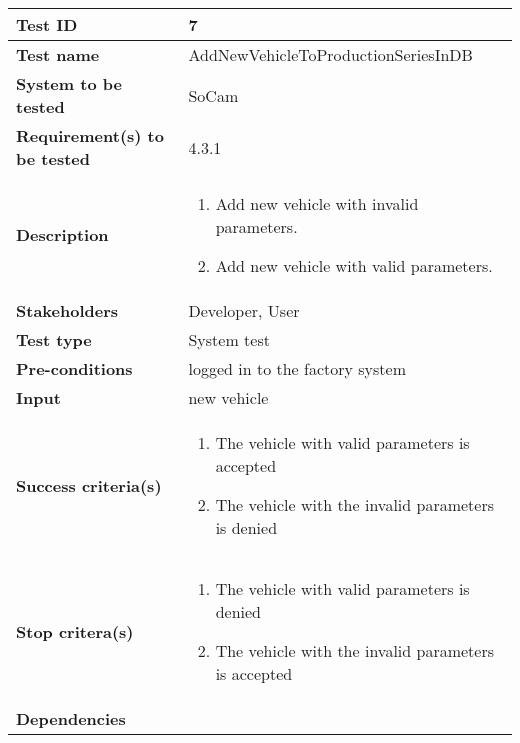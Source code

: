 				\begin{table}[H]
			\begin{tabular}{| p{4cm} | p{10cm} |}
			\hline
			\rowcolor{gray}
				{\bf Test ID} & 7 \\ \hline
				{\bf Test name} & AddNewVehicleToProductionSeriesInDB \\ \hline
				{\bf System to be tested} & SoCam \\ \hline
				{\bf Requirement(s) to be tested} & 4.3.1 \\ \hline
				{\bf Description} & 
					\begin{enumerate}
						\item Add new vehicle with invalid parameters.
						\item Add new vehicle with valid parameters.
					\end{enumerate}
				\\ \hline
				{\bf Stakeholders} & Developer, User \\ \hline
				{\bf Test type} & System test \\ \hline
				{\bf Pre-conditions} & logged in to the factory system \\ \hline
				{\bf Input} & new vehicle \\ \hline
				{\bf Success criteria(s)} & 
					\begin{enumerate}
						\item The vehicle with valid parameters is accepted
						\item The vehicle with the invalid parameters is denied 
					\end{enumerate}
				\\ \hline
				{\bf Stop critera(s)} &  
					\begin{enumerate}
						\item The vehicle with valid parameters is denied 
						\item The vehicle with the invalid parameters is accepted
					\end{enumerate} \\ \hline
				{\bf Dependencies} & \\ \hline
			\end{tabular}
		\end{table}

	

